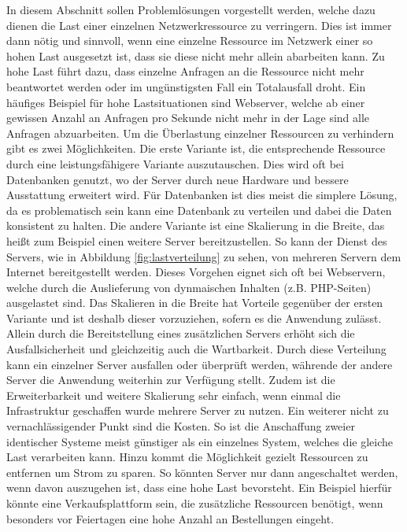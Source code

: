 \documentclass[a4paper, 12pt, BCOR10mm, DIV12, toc=bibliography, toc=listof, german]{scrbook}
\begin{document}
		In diesem Abschnitt sollen Problemlösungen vorgestellt werden, welche dazu dienen die Last einer
		einzelnen Netzwerkressource zu verringern. Dies ist immer dann nötig und sinnvoll, wenn eine
		einzelne Ressource im Netzwerk einer so hohen Last ausgesetzt ist, dass sie diese nicht mehr
		allein abarbeiten kann. Zu hohe Last führt dazu, dass einzelne Anfragen an die Ressource nicht
		mehr beantwortet werden oder im ungünstigsten Fall ein Totalausfall droht. Ein häufiges Beispiel
		für hohe Lastsituationen sind Webserver, welche ab einer gewissen Anzahl an Anfragen pro Sekunde
		nicht mehr in der Lage sind alle Anfragen abzuarbeiten. Um die Überlastung einzelner Ressourcen
		zu verhindern gibt es zwei Möglichkeiten. Die erste Variante ist, die entsprechende Ressource
		durch eine leistungsfähigere Variante auszutauschen. Dies wird oft bei Datenbanken genutzt, wo
		der Server durch neue Hardware und bessere Ausstattung erweitert wird.  Für Datenbanken ist dies
		meist die simplere Lösung, da es problematisch sein kann eine Datenbank zu verteilen und dabei
		die Daten konsistent zu halten. Die andere Variante ist eine Skalierung in die Breite, das heißt
		zum Beispiel einen weitere Server bereitzustellen. So kann der Dienst des Servers, wie in
		Abbildung \ref{fig:lastverteilung} zu sehen, von mehreren Servern dem Internet bereitgestellt
		werden. Dieses Vorgehen eignet sich oft bei Webservern, welche durch die Auslieferung von
		dynmaischen Inhalten (z.B. PHP-Seiten) ausgelastet sind. Das Skalieren in die Breite hat
		Vorteile gegenüber der ersten Variante und ist deshalb dieser vorzuziehen, sofern es die
		Anwendung zulässt.  Allein durch die Bereitstellung eines zusätzlichen Servers erhöht sich die
		Ausfallsicherheit und gleichzeitig auch die Wartbarkeit.  Durch diese Verteilung kann ein
		einzelner Server ausfallen oder überprüft werden, währende der andere Server die Anwendung
		weiterhin zur Verfügung stellt. Zudem ist die Erweiterbarkeit und weitere Skalierung sehr
		einfach, wenn einmal die Infrastruktur geschaffen wurde mehrere Server zu nutzen. Ein weiterer
		nicht zu vernachlässigender Punkt sind die Kosten. So ist die Anschaffung zweier identischer
		Systeme meist günstiger als ein einzelnes System, welches die gleiche Last verarbeiten kann.
		Hinzu kommt die Möglichkeit gezielt Ressourcen zu entfernen um Strom zu sparen. So könnten
		Server nur dann angeschaltet werden, wenn davon auszugehen ist, dass eine hohe Last bevorsteht.
		Ein Beispiel hierfür könnte eine Verkaufsplattform sein, die zusätzliche Ressourcen benötigt,
		wenn	besonders vor Feiertagen eine hohe Anzahl an Bestellungen eingeht.
\end{document}
